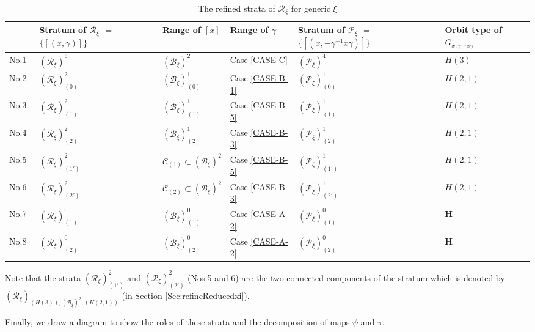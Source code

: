 \documentclass[12pt]{amsart}
\theoremstyle{definition}
\numberwithin{equation}{section}
\newcommand{\Reducedxi}{\mathcal{R}_\xi}
\newcommand{\SET}[1]{\{#1\}}
\newcommand{\Pxi}{\mathcal{P}_{\xi}}
\newcommand{\Bxi}{\mathcal{B}_{\xi}}
\newcommand{\Cartan}{\mathbf{H}}
\begin{document}
    
       \begin{table}[H]\centering
 \caption{The refined strata of  $\Reducedxi  $   for generic $\xi$ } \label{Table:stratagenericxi} 
       \begin{supertabular}{|p{0.9cm}|p{2.3cm}|p{2.3cm}|p{2.1cm}|  p{2.9cm} | p{2.4cm}   |  }
 \hline 
& Stratum of   $\Reducedxi  $ $=$ $\SET{[(x,\gamma)]}$   & Range of $[x]$ & Range of $\gamma$	   &  Stratum of   $\Pxi $ $=$ $\SET{[(x,-\gamma^{-1}x\gamma)]}$  & Orbit type of $G_{x,\gamma^{-1}x\gamma}$ \\  
  \hline No.1~&
  $(\Reducedxi)^6  $ 	& $ (\Bxi)^2   $ & Case \eqref{CASE-C}     & $(\Pxi)^4  $  & $H(3)$ \\ 
  \hline No.2~&
  $(\Reducedxi)^2_{(0)}$ &	$ (\Bxi)^1_{(0)}  $ & Case \eqref{CASE-B-1}     &  $(\Pxi)^1_{(0)}$ &  $H(2,1)$  \\
\hline No.3~&
  $(\Reducedxi)^2_{(1)}$ &	$ (\Bxi)^1_{(1)}  $ & Case \eqref{CASE-B-5}     &  $(\Pxi)^1_{(1)}$ &  $H(2,1)$  \\
  \hline No.4~&
  $(\Reducedxi)^2_{(2)}$ &	$ (\Bxi)^1_{(2)}  $ & Case \eqref{CASE-B-3}     &  $(\Pxi)^1_{(2)}$ &  $H(2,1)$  \\  
  \hline No.5~&
  $(\Reducedxi)^2_{(1')}$ &	$\mathcal{C}_{(1)}\subset (\Bxi)^2   $ & Case \eqref{CASE-B-5}     &  $(\Pxi)^1_{(1')}$ & $H(2,1)$   \\
   \hline No.6~&
  $(\Reducedxi)^2_{(2')}$ &	$\mathcal{C}_{(2)}\subset (\Bxi)^2   $ & Case \eqref{CASE-B-3}     &  $(\Pxi)^1_{(2')}$ & $H(2,1)$   \\
   \hline No.7~&
  $(\Reducedxi)^0_{(1)}$ &	$(\Bxi)^0_{(1)}  $ & Case \eqref{CASE-A-2}   &  $(\Pxi)^0_{(1)}$ &  $\Cartan$   \\
  \hline No.8~&
  $(\Reducedxi)^0_{(2)}$ &	$(\Bxi)^0_{(2)}  $ & Case \eqref{CASE-A-2}   &  $(\Pxi)^0_{(2)}$ &  $\Cartan$   \\
   \hline
   \end{supertabular}

   \end{table}  
Note that the strata $(\Reducedxi)^2_{(1')}$ and $(\Reducedxi)^2_{(2')}$ (Nos.5 and 6) are the two connected components of the stratum which is denoted by $(\Reducedxi)_{(H(3)),(\Bxi)^2   ,(H(2,1))}$
 (in Section \ref{Sec:refineReducedxi}).


 
 Finally, we   draw a diagram to show the roles of these strata and the decomposition of maps $\psi$ and $\pi$. 
  
\end{document}
